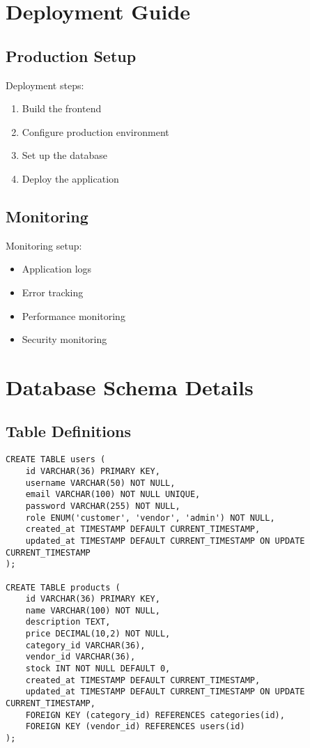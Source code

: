 \section{Deployment Guide}
\subsection{Production Setup}
Deployment steps:
\begin{enumerate}
    \item Build the frontend
    \item Configure production environment
    \item Set up the database
    \item Deploy the application
\end{enumerate}

\subsection{Monitoring}
Monitoring setup:
\begin{itemize}
    \item Application logs
    \item Error tracking
    \item Performance monitoring
    \item Security monitoring
\end{itemize}


\section{Database Schema Details}
\subsection{Table Definitions}
\begin{verbatim}
CREATE TABLE users (
    id VARCHAR(36) PRIMARY KEY,
    username VARCHAR(50) NOT NULL,
    email VARCHAR(100) NOT NULL UNIQUE,
    password VARCHAR(255) NOT NULL,
    role ENUM('customer', 'vendor', 'admin') NOT NULL,
    created_at TIMESTAMP DEFAULT CURRENT_TIMESTAMP,
    updated_at TIMESTAMP DEFAULT CURRENT_TIMESTAMP ON UPDATE CURRENT_TIMESTAMP
);

CREATE TABLE products (
    id VARCHAR(36) PRIMARY KEY,
    name VARCHAR(100) NOT NULL,
    description TEXT,
    price DECIMAL(10,2) NOT NULL,
    category_id VARCHAR(36),
    vendor_id VARCHAR(36),
    stock INT NOT NULL DEFAULT 0,
    created_at TIMESTAMP DEFAULT CURRENT_TIMESTAMP,
    updated_at TIMESTAMP DEFAULT CURRENT_TIMESTAMP ON UPDATE CURRENT_TIMESTAMP,
    FOREIGN KEY (category_id) REFERENCES categories(id),
    FOREIGN KEY (vendor_id) REFERENCES users(id)
);
\end{verbatim}



